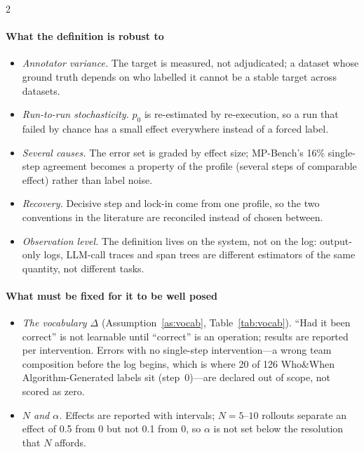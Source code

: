 \begin{multicols}{2}
\paragraph{What the definition is robust to}
\begin{itemize}[leftmargin=1.1em]
\item \emph{Annotator variance.} The target is measured, not adjudicated; a dataset whose ground truth depends on who labelled it cannot be a stable target across datasets.
\item \emph{Run-to-run stochasticity.} $p_0$ is re-estimated by re-execution, so a run that failed by chance has a small effect everywhere instead of a forced label.
\item \emph{Several causes.} The error set is graded by effect size; MP-Bench's 16\% single-step agreement becomes a property of the profile (several steps of comparable effect) rather than label noise.
\item \emph{Recovery.} Decisive step and lock-in come from one profile, so the two conventions in the literature are reconciled instead of chosen between.
\item \emph{Observation level.} The definition lives on the system, not on the log: output-only logs, LLM-call traces and span trees are different estimators of the same quantity, not different tasks.
\end{itemize}

\paragraph{What must be fixed for it to be well posed}
\begin{itemize}[leftmargin=1.1em]
\item \emph{The vocabulary $\Delta$} (Assumption~\ref{as:vocab}, Table~\ref{tab:vocab}). ``Had it been correct'' is not learnable until ``correct'' is an operation; results are reported per intervention. Errors with no single-step intervention---a wrong team composition before the log begins, which is where 20 of 126 Who\&When Algorithm-Generated labels sit (step~0)---are declared out of scope, not scored as zero.
\item \emph{$N$ and $\alpha$.} Effects are reported with intervals; $N=5$--$10$ rollouts separate an effect of 0.5 from 0 but not 0.1 from 0, so $\alpha$ is not set below the resolution that $N$ affords.
\end{itemize}


\end{multicols}
